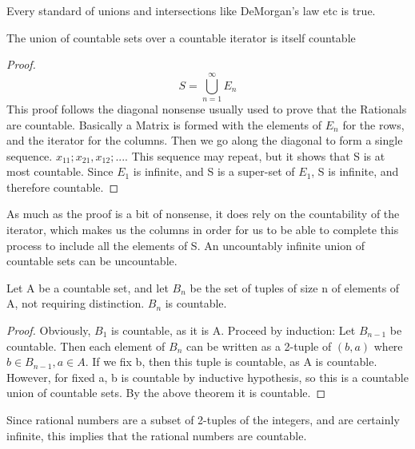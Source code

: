 \documentclass[12pt, letterpaper]{paper}
\begin{document}
Every standard of unions and intersections like DeMorgan's law etc is
true.

\vspace{ .33in }

\begin{theorem}
  \label{thr:2.12}
  The union of countable sets over a countable iterator is itself
  countable
\end{theorem}
\begin{proof}
  \begin{equation*}
    S = \bigcup_{n=1}^{\infty} E_n
  \end{equation*}
  This proof follows the diagonal nonsense usually used to prove that
  the Rationals are countable. Basically a Matrix is formed with the
  elements of $E_n$ for the rows, and the iterator for the
  columns. Then we go along the diagonal to form a single sequence.
  $x_{11}; x_{21}, x_{12}; ...$. This sequence may repeat, but it
  shows that S is at most countable.  Since $E_1$ is infinite, and S
  is a super-set of $E_1$, S is infinite, and therefore countable.
\end{proof}

As much as the proof is a bit of nonsense, it does rely on the
countability of the iterator, which makes us the columns in order for
us to be able to complete this process to include all the elements of
S. An uncountably infinite union of countable sets can be uncountable.

\begin{theorem}
  \label{thr:2.13}
  Let A be a countable set, and let $B_n$ be the set of tuples of size
  n of elements of A, not requiring distinction. $B_n$ is countable.
\end{theorem}
\begin{proof}
  Obviously, $B_1$ is countable, as it is A. Proceed by induction: Let
  $B_{n-1}$ be countable. Then each element of $B_n$ can be written as
  a 2-tuple of $(b,a)$ where $b \in B_{n-1}, a \in A$. If we fix b,
  then this tuple is countable, as A is countable. However, for fixed
  a, b is countable by inductive hypothesis, so this is a countable
  union of countable sets. By the above theorem it is countable.
\end{proof}

Since rational numbers are a subset of 2-tuples of the integers, and
are certainly infinite, this implies that the rational numbers are
countable.
\end{document}
